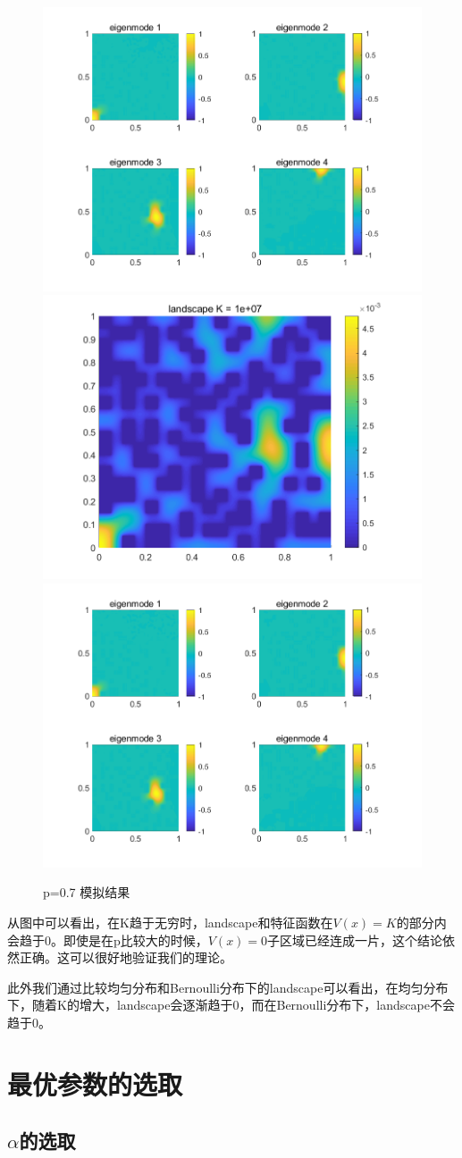 \documentclass[12pt,a4paper]{article}
\begin{document}
\begin{figure}[htbp]
\includegraphics[width=0.4\linewidth]{potential/P7K3U}
\includegraphics[width=0.4\linewidth]{potential/P7K4W}
\includegraphics[width=0.4\linewidth]{potential/P7K4U}
\caption{p=0.7 模拟结果}
\label{P7}
\end{figure}

从图中可以看出，在K趋于无穷时，landscape和特征函数在$V(x) = K$的部分内会趋于0。即使是在p比较大的时候，$V(x)=0$子区域已经连成一片，这个结论依然正确。这可以很好地验证我们的理论。

此外我们通过比较均匀分布和Bernoulli分布下的landscape可以看出，在均匀分布下，随着K的增大，landscape会逐渐趋于0，而在Bernoulli分布下，landscape不会趋于0。

\newpage

\section{最优参数的选取}\label{parameter}

\subsection{$\alpha$的选取}
\end{document}
